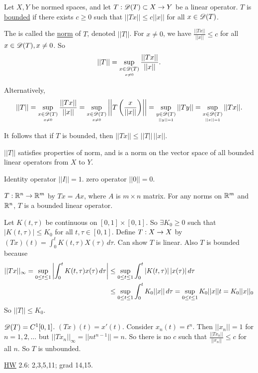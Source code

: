 \documentclass[]{article}
\begin{document}
\newpage

\begin{definition}
	Let $X,Y$ be normed spaces, and let $T:\mathscr{D}(T)\subset X\rightarrow Y$ be a linear operator.
	$T$ is \ul{bounded} if there exists $c\geq0$ such that $||Tx|| \leq c||x||$ for all $x\in\mathscr{D}(T)$.
\end{definition}
\begin{definition}
The  is called the \ul{norm} of $T$, denoted $||T||$.
For $x\neq0$, we have $\frac{||Tx||}{||x||}\leq c$ for all $x\in\mathscr{D}(T),x\neq0$.
So $$||T|| = \sup_{\underset{x\neq0}{x\in\mathscr{D}(T)}}\frac{||Tx||}{||x||}.$$
\end{definition}
Alternatively, $$ ||T|| = \sup_{\underset{x\neq0}{x\in\mathscr{D}(T)}}\frac{||Tx||}{||x||} = \sup_{\underset{x\neq0}{x\in\mathscr{D}(T)}} \left|\left|T\left(\frac x{||x||}\right)\right|\right| = \sup_{\underset{||y||=1}{y\in\mathscr{D}(T)}}||Ty|| = \sup_{\underset{||x||=1}{x\in\mathscr{D}(T)}}||Tx||.$$
\begin{note}
	It follows that if $T$ is bounded, then $||Tx|| \leq ||T||\,||x||$.
\end{note}
\begin{note}
	$||T||$ satisfies properties of  norm, and is a norm on the vector space of all bounded linear operators from $X$ to $Y$.
\end{note}
\begin{example}
	Identity operator $||I|| = 1$. zero operator $||0||=0$.
\end{example}
\begin{example}
	$T:\mathbb{R}^n\rightarrow\mathbb{R}^m$ by $Tx=Ax$, where $A$ is $m\times n$ matrix.
	For any norms on $\mathbb{R}^m$ and $\mathbb{R}^n$, $T$ is a bounded linear operator.
\end{example}
\begin{example}
	[$X = C{[}0,1{]}$ with $||\cdot||_\infty$]
	Let $K(t,\tau)$ be continuous on $[0,1]\times[0,1]$. So $\exists K_0\geq 0$ such that $|K(t,\tau)|\leq K_0$ for all $t,\tau\in[0,1]$.
	Define $T:X\rightarrow X$ by $(Tx)(t) = \int_0^t K(t,\tau)X(\tau)\,d\tau$.
	Can show $T$ is linear. Also $T$ is bounded because 
	\begin{align*}
		|| Tx||_\infty = \sup_{0\leq t\leq1}\left|\int_0^t K(t,\tau)x(\tau)\,d\tau\right|
		&\leq \sup_{0\leq t\leq 1}\int_0^t |K(t,\tau)|\,|x(\tau)|\,d\tau \\
		&\leq \sup_{0\leq t\leq 1}\int_0^t K_0||x||\,d\tau
					   = \sup_{0\leq t\leq 1}K_0||x||t
					   = K_0||x||_0
	\end{align*}
	So $||T||\leq K_0$.
\end{example}
\begin{example}
	[$X = C{[}0,1{]}$ with $||\cdot||_\infty$]
	$\mathscr{D}(T) = C^1[0,1]$.
	$(Tx)(t) = x'(t)$.
	Consider $x_n(t) = t^n$.
	Then $||x_n||=1$ for $n=1,2,\dots$
	but $||Tx_n||_\infty = ||nt^{n-1}||=n$.
	So there is  no $c$ such that $\frac{||Tx_n||}{||x_n||}\leq c$ for all $n$.
	So $T$ is unbounded.
\end{example}
\ul{HW} 2.6: 2,3,5,11; grad 14,15.
\end{document}
